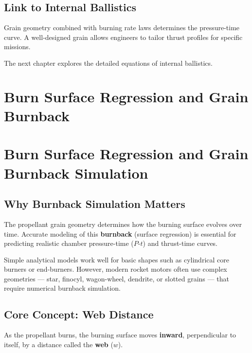 \documentclass[
  letterpaper,
  DIV=11,
  numbers=noendperiod]{scrreprt}
\begin{document}
\section{Link to Internal Ballistics}\label{link-to-internal-ballistics}

Grain geometry combined with burning rate laws determines the
pressure-time curve. A well-designed grain allows engineers to tailor
thrust profiles for specific missions.

The next chapter explores the detailed equations of internal ballistics.


\chapter{Burn Surface Regression and Grain
Burnback}\label{burn-surface-regression-and-grain-burnback}


\chapter{Burn Surface Regression and Grain Burnback
Simulation}\label{burn-surface-regression-and-grain-burnback-simulation}

\section{Why Burnback Simulation
Matters}\label{why-burnback-simulation-matters}

The propellant grain geometry determines how the burning surface evolves
over time. Accurate modeling of this \textbf{burnback} (surface
regression) is essential for predicting realistic chamber pressure-time
(\(P\)-\(t\)) and thrust-time curves.

Simple analytical models work well for basic shapes such as cylindrical
core burners or end-burners. However, modern rocket motors often use
complex geometries --- star, finocyl, wagon-wheel, dendrite, or slotted
grains --- that require numerical burnback simulation.

\section{Core Concept: Web Distance}\label{core-concept-web-distance}

As the propellant burns, the burning surface moves \textbf{inward},
perpendicular to itself, by a distance called the \textbf{web} (\(w\)).
\end{document}

